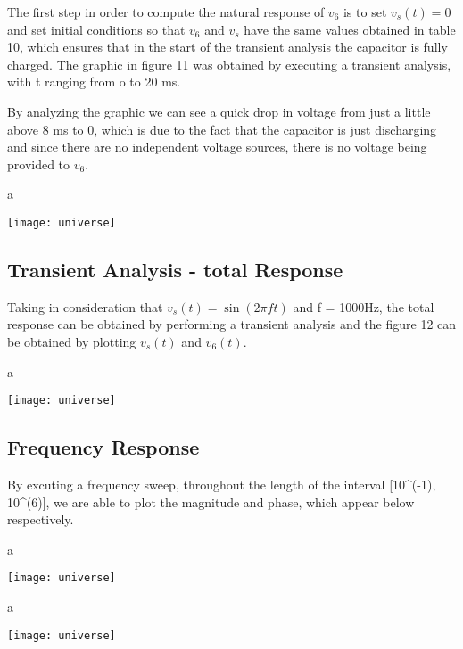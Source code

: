 The first step in order to compute the natural response of $v_6$ is to set $v_s(t) = 0$ and set initial conditions so that $v_6$ and $v_s$ have the same values obtained in table 10, which ensures that in the start of the transient analysis the capacitor is fully charged. The graphic in figure 11 was obtained by executing a transient analysis, with t ranging from o to 20 ms.

By analyzing the graphic we can see a quick drop in voltage from just a little above 8 ms to 0, which is due to the fact that the capacitor is just discharging and since there are no independent voltage sources, there is no voltage being provided to $v_6$.
\usepackage{graphicx}
\graphicspath{ {./images/} }

a

\texttt{[image: universe]}

\subsection{Transient Analysis - total Response}

Taking in consideration that $v_s(t) = \sin(2\pi ft)$ and f = 1000Hz, the total response can be obtained by performing a transient analysis and the figure 12 can be obtained by plotting $v_s(t)$ and $v_6(t)$. 
\usepackage{graphicx}
\graphicspath{ {./images/} }

a

\texttt{[image: universe]}

\subsection{Frequency Response}

By excuting a frequency sweep, throughout the length of the interval [10^(-1), 10^(6)], we are able to plot the magnitude and phase, which appear below respectively.

\usepackage{graphicx}
\graphicspath{ {./images/} }

a

\texttt{[image: universe]}

\usepackage{graphicx}
\graphicspath{ {./images/} }

a

\texttt{[image: universe]}